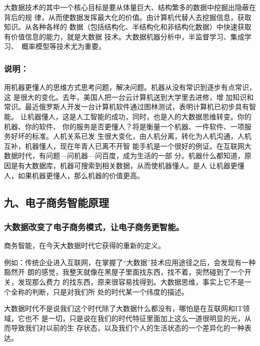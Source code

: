 \documentclass[11pt]{ctexart}
\begin{document}
{{{{大数据技术的其中一个核心目标是要从体量巨大、结构繁多的数据中挖掘出隐蔽在背后的规
律，从而使数据发挥最大化的价值。由计算机代替人去挖掘信息，获取知识。从各种各样的
数据（包括结构化、半结构化和非结构化数据）中快速获取有价值信息的能力，就是大数据
技术。大数据机器分析中，半监督学习、集成学习、 概率模型等技术尤为重要。

\subsubsection{说明：}
\label{sec:orgb5f29a6}

用机器更懂人的思维方式思考问题，解决问题。机器从没有常识到逐步有点常识，这
是很大的变化。去年，美国人把一台云计算机送到大学里去进修，增
加知识和常识。最近俄罗斯人开发一台计算机软件通过图林测试，表明计算机已初步具有智能。
让机器懂人，这是人工智能的成功，同时，也是人的大数据思维转变。你的机器、你的软件、
你的服务是否更懂人？将是衡量一个机器、一件软件、一项服务好坏的标准。人机关系已发
生很大变化，由人机分离，转化为人机沟通，人机互补，机器懂人，现在年青人已离不开智
能手机是一个很好的例证。在互联网大数据时代，有问题—问机器—问百度，成为生活的一部
分。机器什么都知道，原因是有大数据库，机器可搜索到相关数据，从而使机器懂人。是人
让机器更懂人，如果机器更懂人，那么机器的价值更高。

\subsection{九、电子商务智能原理}
\label{sec:orge0f4459}

\subsubsection{大数据改变了电子商务模式，让电子商务更智能。}
\label{sec:org1eb4ae5}

商务智能，在今天大数据时代它获得的重新的定义。

例如：传统企业进入互联网，在掌握了“大数据”技术应用途径之后，会发现有一种豁然开
朗的感觉，我整天就像在黑屋子里面找东西，找不着，突然碰到了一个开关，发现那么费力
的找东西，原来很容易找得到。大数据思维，事实上它不是一个全称的判断，只是对我们所
处的时代某一个纬度的描述。

大数据时代不是说我们这个时代除了大数据什么都没有，哪怕是在互联网和IT领域，它也不
是一切，只是说在我们的时代特征里面加上这么一道很明显的光，从而导致我们对以前的生
存状态，以及我们个人的生活状态的一个差异化的一种表达。

}}}}
\end{document}
